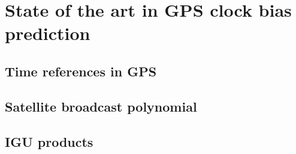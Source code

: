 \section{State of the art in GPS clock bias prediction}

\subsection{Time references in GPS}

\subsection{Satellite broadcast polynomial}

\subsection{IGU products}
